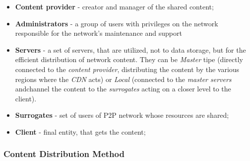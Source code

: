 \documentclass{llncs}
\begin{document}

\begin{itemize}
\item \textbf{Content provider} - creator and manager of the shared content;

\item \textbf{Administrators} - a group of users with privileges on the 
network responsible for the network's maintenance and support

\item \textbf{Servers} - a set of servers, that are utilized, not to
data storage, but for the efficient distribution of network content.
They can be \emph{Master} tipe (directly connected to the
\emph{content provider}, distributing the content by the various regions
where the \textit{CDN} acts) or \emph{Local} (connected to the 
\emph{master servers} andchannel the content to the \emph{surrogates}
acting on a closer level to the client).

\item \textbf{Surrogates} - set of users of P2P network whose
resources are shared;

\item \textbf{Client} - final entity, that gets the content;

\end{itemize}



\subsubsection{Content Distribution Method}
\end{document}
